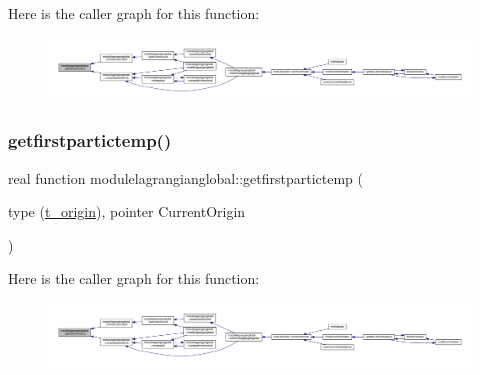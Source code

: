Here is the caller graph for this function\+:\nopagebreak
\begin{figure}[H]
\begin{center}
\leavevmode
\includegraphics[width=350pt]{namespacemodulelagrangianglobal_a419bd4bef813f469c2fc04f9e386890e_icgraph}
\end{center}
\end{figure}
\mbox{\label{namespacemodulelagrangianglobal_a19c897c8ad7d0daf71fbab9514077b55}} 
\subsubsection{\texorpdfstring{getfirstpartictemp()}{getfirstpartictemp()}}
{\footnotesize\ttfamily real function modulelagrangianglobal\+::getfirstpartictemp (\begin{DoxyParamCaption}\item[{type (\mbox{\hyperlink{structmodulelagrangianglobal_1_1t__origin}{t\+\_\+origin}}), pointer}]{Current\+Origin }\end{DoxyParamCaption})\hspace{0.3cm}{\ttfamily [private]}}

Here is the caller graph for this function\+:\nopagebreak
\begin{figure}[H]
\begin{center}
\leavevmode
\includegraphics[width=350pt]{namespacemodulelagrangianglobal_a19c897c8ad7d0daf71fbab9514077b55_icgraph}
\end{center}
\end{figure}
\mbox{\label{namespacemodulelagrangianglobal_ad61d5f10ce5c10c555891aa6da16a247}} 
